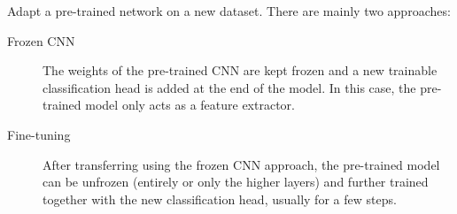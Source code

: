 Adapt a pre-trained network on a new dataset. There are mainly two approaches:
\begin{description}
    \item[Frozen CNN]
        The weights of the pre-trained CNN are kept frozen and a new trainable classification head is added at the end of the model. In this case, the pre-trained model only acts as a feature extractor.

    \item[Fine-tuning] 
        After transferring using the frozen CNN approach, the pre-trained model can be unfrozen (entirely or only the higher layers) and further trained together with the new classification head, usually for a few steps.
\end{description}